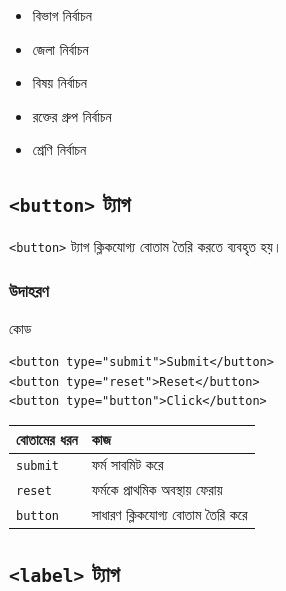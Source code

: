 \begin{itemize}
\item বিভাগ নির্বাচন
\item জেলা নির্বাচন
\item বিষয় নির্বাচন
\item রক্তের গ্রুপ নির্বাচন
\item শ্রেণি নির্বাচন
\end{itemize}

\subsection{\texttt{<button>} ট্যাগ}

\begin{definitionbox}{}
\texttt{<button>} ট্যাগ ক্লিকযোগ্য বোতাম তৈরি করতে ব্যবহৃত হয়।
\end{definitionbox}

\subsubsection{উদাহরণ}

\begin{examplebox}{কোড}
\par\noindent\begin{minipage}{\linewidth}
\begin{verbatim}
<button type="submit">Submit</button>
<button type="reset">Reset</button>
<button type="button">Click</button>
\end{verbatim}
\end{minipage}\par
\end{examplebox}

\begin{center}
\begin{tabular}{|p{}|p{}|}
\hline
\textbf{বোতামের ধরন} & \textbf{কাজ} \\
\hline
\texttt{submit} & ফর্ম সাবমিট করে \\
\hline
\texttt{reset} & ফর্মকে প্রাথমিক অবস্থায় ফেরায় \\
\hline
\texttt{button} & সাধারণ ক্লিকযোগ্য বোতাম তৈরি করে \\
\hline
\end{tabular}
\end{center}

\subsection{\texttt{<label>} ট্যাগ}

